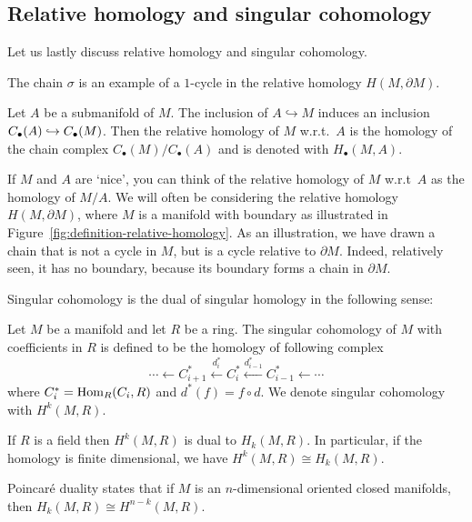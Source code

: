 \subsection*{Relative homology and singular cohomology}

Let us lastly discuss relative homology and singular cohomology.


\begin{marginfigure}
    \centering
    \caption{The chain $\sigma$ is an example of a  $1$-cycle in the relative homology $H(M, \partial M)$.}
    \label{fig:definition-relative-homology}
\end{marginfigure}
\begin{definition}
    Let $A$ be a submanifold of $M$.
    The inclusion of $A \hookrightarrow M$ induces an inclusion  $C_{\bullet}(A) \hookrightarrow C_{\bullet}(M)$.
    Then the relative homology of $M$ w.r.t.\  $A$ is the homology of the chain complex  $C_\bullet(M) / C_\bullet(A)$ and is denoted with $H_{\bullet}(M, A)$.
\end{definition}

If $M$ and $A$ are `nice', you can think of the relative homology of $M$ w.r.t\  $A$ as the homology of  $M / A$.
We will often be considering the relative homology $H(M, \partial M)$, where $M$ is a manifold with boundary as illustrated in Figure~\ref{fig:definition-relative-homology}.
As an illustration, we have drawn a chain that is not a cycle in $M$, but is a cycle relative to $\partial M$. Indeed, relatively seen, it has no boundary, because its boundary forms a chain in $\partial M$.

\bigskip

Singular cohomology is the dual of singular homology in the following sense:
\begin{definition}
    Let $M$ be a manifold and let $R$ be a ring.
    The singular cohomology of $M$ with coefficients in $R$ is defined to be the homology of following complex
    \[
    \cdots \leftarrow C_{i+1}^{*} \xleftarrow{d_i^{*}}  
    C_{i}^{*} \xleftarrow{d_{i-1}^{*}}  
    C_{i-1}^{*} \leftarrow \cdots
    \] 
    where $C_{i}^{*} = \operatorname{Hom}_R(C_i, R)$ and $d^{*}(f) = f \circ  d$.
    We denote singular cohomology with $H^{k}(M, R)$.
\end{definition}
\begin{remark}
    If $R$ is a field then $H^{k}(M, R)$ is dual to $H_k(M, R)$.
    In particular, if the homology is finite dimensional, we have $H^{k}(M, R) \cong H_k(M, R)$.
\end{remark}
\begin{remark}
    Poincaré duality states that if $M$ is an  $n$-dimensional oriented closed manifolds, then $H_k(M, R) \cong H^{n-k}(M, R)$.
\end{remark}


